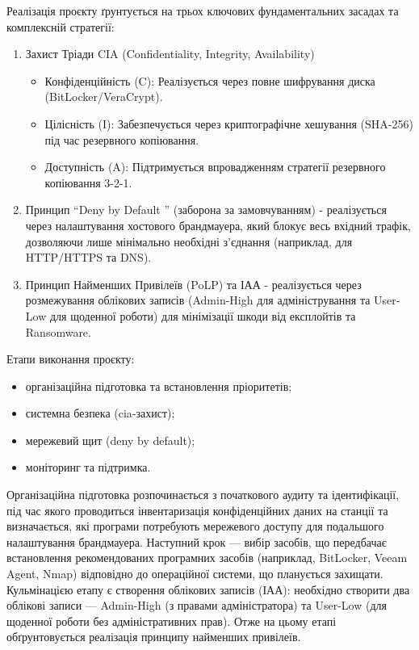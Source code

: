 Реалізація проєкту ґрунтується на трьох ключових фундаментальних засадах та комплексній стратегії:
\begin{enumerate}
    \item Захист Тріади CIA (Confidentiality, Integrity, Availability)
    \begin{itemize}
        \item Конфіденційність (C): Реалізується через повне шифрування диска (BitLocker/VeraCrypt).
        \item Цілісність (I): Забезпечується через криптографічне хешування (SHA-256) під час резервного копіювання.
        \item Доступність (A): Підтримується впровадженням стратегії резервного копіювання 3-2-1.
    \end{itemize}
    \item Принцип ``Deny by Default '' (заборона за замовчуванням) - реалізується через налаштування хостового брандмауера, який блокує весь вхідний трафік, дозволяючи лише мінімально необхідні з'єднання (наприклад, для HTTP/HTTPS та DNS).
    \item Принцип Найменших Привілеїв (PoLP) та ІАА - реалізується через розмежування облікових записів (Admin-High для адміністрування та User-Low для щоденної роботи) для мінімізації шкоди від експлойтів та Ransomware.
\end{enumerate}

Етапи виконання проєкту:
\begin{itemize}
    \item організаційна підготовка та встановлення пріоритетів;
    \item системна безпека (cia-захист);
    \item мережевий щит (deny by default);
    \item моніторинг та підтримка.
\end{itemize}

Організаційна підготовка розпочинається з початкового аудиту та ідентифікації, під час якого проводиться інвентаризація конфіденційних даних на станції та визначається, які програми потребують мережевого доступу для подальшого налаштування брандмауера. Наступний крок — вибір засобів, що передбачає встановлення рекомендованих програмних засобів (наприклад, BitLocker, Veeam Agent, Nmap) відповідно до операційної системи, що планується захищати. Кульмінацією етапу є створення облікових записів (ІАА): необхідно створити два облікові записи — Admin-High (з правами адміністратора) та User-Low (для щоденної роботи без адміністративних прав). Отже на цьому етапі обґрунтовується  реалізація принципу найменших привілеїв.


